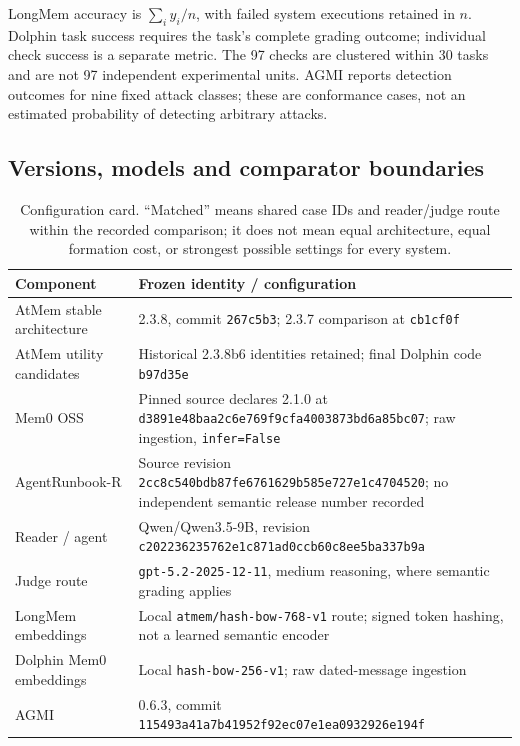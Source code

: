 \documentclass[10pt,twocolumn]{article}
\newcommand{\code}[1]{\texttt{\small #1}}
\begin{document}
LongMem accuracy is $\sum_i y_i/n$, with failed system executions retained in $n$. Dolphin task success requires the task's complete grading outcome; individual check success is a separate metric. The 97 checks are clustered within 30 tasks and are not 97 independent experimental units. AGMI reports detection outcomes for nine fixed attack classes; these are conformance cases, not an estimated probability of detecting arbitrary attacks.

\subsection{Versions, models and comparator boundaries}
\begin{table}[t]
\centering\small
\begin{tabularx}{\linewidth}{p{.23\linewidth}Y}
\toprule
Component & Frozen identity / configuration\\\midrule
AtMem stable architecture & 2.3.8, commit \code{267c5b3}; 2.3.7 comparison at \code{cb1cf0f}\\
AtMem utility candidates & Historical 2.3.8b6 identities retained; final Dolphin code \code{b97d35e}\\
Mem0 OSS & Pinned source declares 2.1.0 at \code{d3891e48baa2c6e769f9cfa4003873bd6a85bc07}; raw ingestion, \code{infer=False}\\
AgentRunbook-R & Source revision \code{2cc8c540bdb87fe6761629b585e727e1c4704520}; no independent semantic release number recorded\\
Reader / agent & Qwen/Qwen3.5-9B, revision \code{c202236235762e1c871ad0ccb60c8ee5ba337b9a}\\
Judge route & \code{gpt-5.2-2025-12-11}, medium reasoning, where semantic grading applies\\
LongMem embeddings & Local \code{atmem/hash-bow-768-v1} route; signed token hashing, not a learned semantic encoder\\
Dolphin Mem0 embeddings & Local \code{hash-bow-256-v1}; raw dated-message ingestion\\
AGMI & 0.6.3, commit \code{115493a41a7b41952f92ec07e1ea0932926e194f}\\\bottomrule
\end{tabularx}
\caption{Configuration card. ``Matched'' means shared case IDs and reader/judge route within the recorded comparison; it does not mean equal architecture, equal formation cost, or strongest possible settings for every system.}
\label{tab:config}
\end{table}
\end{document}
